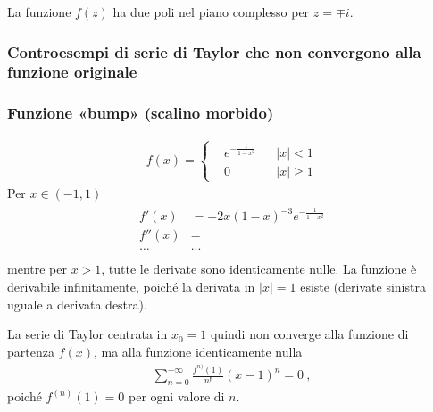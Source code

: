 \documentclass[letterpaper,10pt,italian]{jupyterBook}
\begin{document}
\sphinxAtStartPar
{} 

\sphinxAtStartPar
{} La funzione \(f(z)\) ha due poli nel piano complesso per \(z = \mp i\).


\subsubsection{Controesempi di serie di Taylor che non convergono alla funzione originale}
\label{\detokenize{ch/series/series-functions-real:controesempi-di-serie-di-taylor-che-non-convergono-alla-funzione-originale}}\subsubsection*{Funzione «bump» (scalino morbido)}
\begin{equation*}
\begin{split}f(x) = \left\{ \begin{aligned} & e^{-\frac{1}{1-x^2}} &&  |x| < 1 \\ & 0 && |x| \ge 1 \end{aligned} \right.\end{split}
\end{equation*}
\sphinxAtStartPar
Per \(x \in (-1,1)\)
\begin{equation*}
\begin{split}\begin{aligned}
  f'(x) & = -2 x \left( 1 - x \right)^{-3} e^{-\frac{1}{1-x^2}} \\
  f''(x) & = \\
  \dots & ... \\
\end{aligned}\end{split}
\end{equation*}
\sphinxAtStartPar
mentre per \(x > 1\), tutte le derivate sono identicamente nulle. La funzione è derivabile infinitamente, poiché la derivata in \(|x| = 1\) esiste (derivate sinistra uguale a derivata destra).

\sphinxAtStartPar
La serie di Taylor centrata in \(x_0 = 1\) quindi non converge alla funzione di partenza \(f(x)\), ma alla funzione identicamente nulla
\begin{equation*}
\begin{split}\sum_{n=0}^{+\infty} \frac{f^{n)}(1)}{n!} (x - 1)^n = 0 \ ,\end{split}
\end{equation*}
\sphinxAtStartPar
poiché \(f^{(n)}(1) = 0\) per ogni valore di \(n\).
\end{document}
